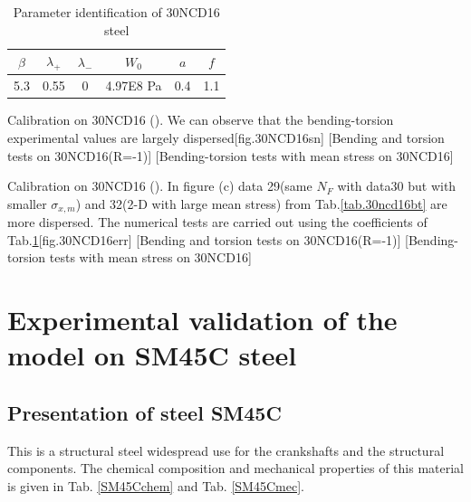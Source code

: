 \begin{table}[!h]
\centering
\begin{tabular}{|c|c|c|c|c|c|}
	\hline
	\textbf{$\beta$} & \textbf{$\lambda_+$} & \textbf{$\lambda_-$} & \textbf{$W_0$} & \textbf{$a$}& \textbf{$f$}  \\ \hline
	5.3     & 0.55 &0         &4.97E8 Pa  & 0.4& 1.1   \\ \hline
\end{tabular}
\caption{Parameter identification of 30NCD16 steel}
\label{30ncdpara2}
\end{table}

\begin{Figure}[!h]{Calibration on  30NCD16 (\cite{Dubar1992}). We can observe that the bending-torsion experimental values are largely dispersed}[fig.30NCD16sn]
	[Bending and torsion tests on 30NCD16(R=-1)]
	[Bending-torsion tests with mean stress on 30NCD16]
\end{Figure}

\begin{Figure}[!h]{Calibration on  30NCD16 (\cite{Dubar1992}). In figure (c) data 29(same $N_F$ with data30 but with smaller $\sigma_{x,m}$) and 32(2-D with large mean stress)  from Tab.\ref{tab.30ncd16bt} are more dispersed. The numerical tests are carried out using the coefficients of Tab.\ref{30ncdpara2}}[fig.30NCD16err]
[Bending and torsion tests on 30NCD16(R=-1)]
[Bending-torsion tests with mean stress on 30NCD16]
\end{Figure}


\clearpage
\section{Experimental validation of the model on SM45C steel}
\subsection{Presentation of steel SM45C}
This is a structural steel widespread use for the crankshafts and the structural components. The chemical composition and mechanical properties of this material is given in Tab. \ref{SM45Cchem} and Tab. \ref{SM45Cmec}.

